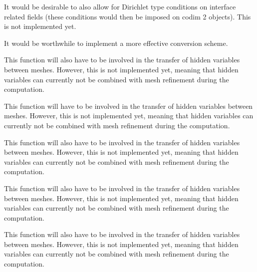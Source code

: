 \begin{DoxyRefList}
%
It would be desirable to also allow for Dirichlet type conditions on interface related fields (these conditions would then be imposed on codim 2 objects). This is not implemented yet. 
\item[Member \mbox{\hyperlink{class_do_f_renumbering_offset_a5df6c4b70b1394c3670ced634146c9a9}{Do\+F\+Renumbering\+Offset::dof\+\_\+offsets}} ]\label{todo__todo000011}%
%
It would be worthwhile to implement a more effective conversion scheme.  
\item[Member \mbox{\hyperlink{classparallel_1_1_triangulation_system_a951181f2ad877283d458fa19db42efb2}{parallel::Triangulation\+System$<$ spacedim $>$::post\+\_\+refinement\+\_\+domain}} ()]\label{todo__todo000016}%
%
This function will also have to be involved in the transfer of hidden variables between meshes. However, this is not implemented yet, meaning that hidden variables can currently not be combined with mesh refinement during the computation.  
\item[Member \mbox{\hyperlink{classparallel_1_1_triangulation_system_a79e9789e83e12900c85cf8de0644271f}{parallel::Triangulation\+System$<$ spacedim $>$::pre\+\_\+refinement\+\_\+domain}} ()]\label{todo__todo000015}%
%
This function will have to be involved in the transfer of hidden variables between meshes. However, this is not implemented yet, meaning that hidden variables can currently not be combined with mesh refinement during the computation.  
\item[Member \mbox{\hyperlink{class_triangulation_system_a62be2563cc8d810a71941e15490f9840}{Triangulation\+System$<$ spacedim $>$::execute\+\_\+coarsening\+\_\+and\+\_\+refinement}} ()]\label{todo__todo000014}%
%
This function will also have to be involved in the transfer of hidden variables between meshes. However, this is not implemented yet, meaning that hidden variables can currently not be combined with mesh refinement during the computation.  
\item[Member \mbox{\hyperlink{class_triangulation_system_a8435489384095f687363d200ccfce628}{Triangulation\+System$<$ spacedim $>$::post\+\_\+refinement\+\_\+domain}} ()]\label{todo__todo000013}%
%
This function will also have to be involved in the transfer of hidden variables between meshes. However, this is not implemented yet, meaning that hidden variables can currently not be combined with mesh refinement during the computation.  
\item[Member \mbox{\hyperlink{class_triangulation_system_ae1862e6da3157dc8d539fdc0439e9f48}{Triangulation\+System$<$ spacedim $>$::pre\+\_\+refinement\+\_\+domain}} ()]\label{todo__todo000012}%
%
This function will also have to be involved in the transfer of hidden variables between meshes. However, this is not implemented yet, meaning that hidden variables can currently not be combined with mesh refinement during the computation. 
\end{DoxyRefList}